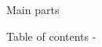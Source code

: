 %
%


\begin{frame}[t]{Main parts}

\setcounter{tocdepth}{1}
\tableofcontents
\end{frame}


\begin{frame}[allowframebreaks,t]{Table of contents -}

\setcounter{tocdepth}{3}
\setcounter{secnumdepth}{2}
\tableofcontents


\end{frame}

